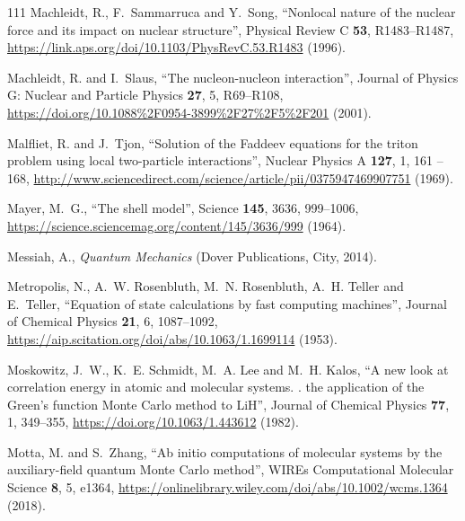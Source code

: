 \documentclass[12pt,letterpaper,UTF8]{report}
\begin{document}
{\begin{thebibliography}{111}
Machleidt, R., F.~Sammarruca and Y.~Song, \enquote{Nonlocal nature of the
  nuclear force and its impact on nuclear structure}, Physical Review C
  \textbf{53}, R1483--R1487,
  \urlprefix\url{https://link.aps.org/doi/10.1103/PhysRevC.53.R1483} (1996).

Machleidt, R. and I.~Slaus, \enquote{The nucleon-nucleon interaction}, Journal
  of Physics G: Nuclear and Particle Physics \textbf{27}, 5, R69--R108,
  \urlprefix\url{https://doi.org/10.1088%2F0954-3899%2F27%2F5%2F201} (2001).

Malfliet, R. and J.~Tjon, \enquote{Solution of the {Faddeev} equations for the
  triton problem using local two-particle interactions}, Nuclear Physics A
  \textbf{127}, 1, 161 -- 168,
  \urlprefix\url{http://www.sciencedirect.com/science/article/pii/0375947469907751}
  (1969).

Mayer, M.~G., \enquote{The shell model}, Science \textbf{145}, 3636, 999--1006,
  \urlprefix\url{https://science.sciencemag.org/content/145/3636/999} (1964).

Messiah, A., \emph{Quantum Mechanics} (Dover Publications, City, 2014).

Metropolis, N., A.~W. Rosenbluth, M.~N. Rosenbluth, A.~H. Teller and E.~Teller,
  \enquote{Equation of state calculations by fast computing machines}, Journal
  of Chemical Physics \textbf{21}, 6, 1087--1092,
  \urlprefix\url{https://aip.scitation.org/doi/abs/10.1063/1.1699114} (1953).

Moskowitz, J.~W., K.~E. Schmidt, M.~A. Lee and M.~H. Kalos, \enquote{A new look
  at correlation energy in atomic and molecular systems. {}. the
  application of the {Green}'s function {Monte} {Carlo} method to {LiH}},
  Journal of Chemical Physics \textbf{77}, 1, 349--355,
  \urlprefix\url{https://doi.org/10.1063/1.443612} (1982).

Motta, M. and S.~Zhang, \enquote{Ab initio computations of molecular systems by
  the auxiliary-field quantum {Monte} {Carlo} method}, WIREs Computational
  Molecular Science \textbf{8}, 5, e1364,
  \urlprefix\url{https://onlinelibrary.wiley.com/doi/abs/10.1002/wcms.1364}
  (2018).


\end{thebibliography}}
\end{document}
